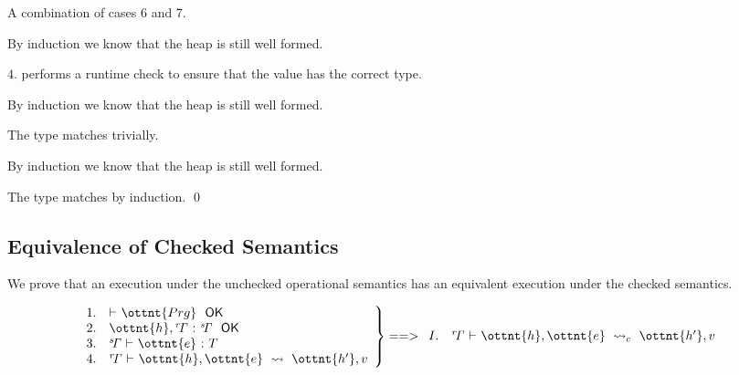 
A combination of cases 6 and 7.



By induction we know that the heap is still well formed.

$4.$ performs a runtime check to ensure that the value has the correct
type.



By induction we know that the heap is still well formed.

The type matches trivially.



By induction we know that the heap is still well formed.

The type matches by induction.
\qed


\subsection{Equivalence of Checked Semantics}

We prove that an execution under the unchecked operational semantics has an
equivalent execution under the checked semantics.

\begin{theorem}
\label{thm:cs}
\[
\left.
\begin{array}{ll}
1. &  \textsf{$\vdash$} \  \ottnt{Prg} \ \  \textsf{OK} \\
2. &  \ottnt{h} ,  \mathit{ {^r}\!\Gamma} \  \textsf{:} \  \mathit{ {^s}\!\Gamma} \ \  \textsf{OK} \\
3. &  \mathit{ {^s}\!\Gamma} \  \textsf{$\vdash$} \  \ottnt{e} \  \textsf{:} \  T \\
4. &  \mathit{ {^r}\!\Gamma} \  \textsf{$\vdash$} \  \ottnt{h} ,  \ottnt{e} \ \leadsto\  \ottnt{h'} ,  v \\
\end{array}
\right\} ==>
\begin{array}{ll}
I. &  \mathit{ {^r}\!\Gamma} \  \textsf{$\vdash$} \  \ottnt{h} ,  \ottnt{e} \ \leadsto_{c}\  \ottnt{h'} ,  v \\
\end{array}
\]
\end{theorem}


